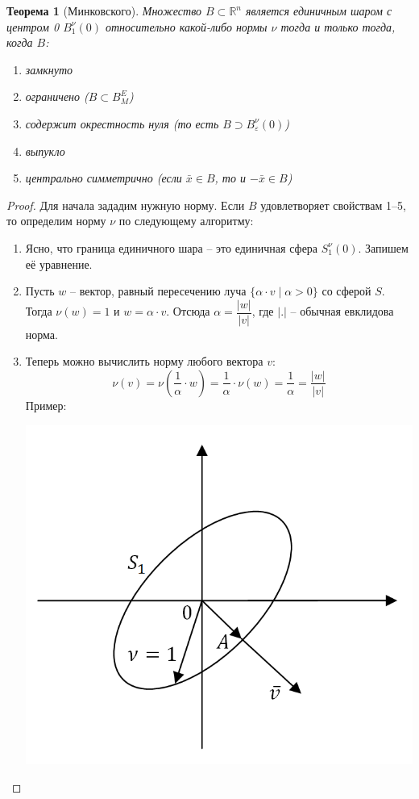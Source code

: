 \documentclass[12pt]{article}
\newtheorem*{theorem}{Теорема}
\begin{document}
	\begin{theorem}[Минковского]
		Множество $B \subset \mathbb{R}^n$ является единичным шаром с центром 0 $B_1^{\nu}(0)$ относительно какой-либо нормы $\nu$ тогда и только тогда, когда $B$:\begin{enumerate}
			\item замкнуто
			\item ограничено ($B \subset B_M^E$)
			\item содержит окрестность нуля (то есть $B \supset B_\varepsilon^\nu(0)$)
			\item выпукло
			\item центрально симметрично (если $\bar x \in B$, то и $-\bar x \in B$)
		\end{enumerate}
	\end{theorem}
	\begin{proof}
		 Для начала зададим нужную норму. Если $B$ удовлетворяет свойствам 1--5, то определим норму $\nu$ по следующему алгоритму:
		\begin{enumerate}
			\item Ясно, что граница единичного шара -- это единичная сфера $S_1^\nu(0)$. Запишем её уравнение.
			\item Пусть $w$ -- вектор, равный пересечению луча $\{\alpha\cdot v\mid \alpha > 0\}$ со сферой $S$. Тогда $\nu(w) = 1$ и $w = \alpha \cdot v$. Отсюда $\alpha = \dfrac{|w|}{|v|}$, где $|.|$ -- обычная евклидова норма.
			\item Теперь можно вычислить норму любого вектора $v$:
				\[\nu(v) = \nu\left(\dfrac{1}{\alpha}\cdot w\right) = \dfrac{1}{\alpha} \cdot \nu(w) = \dfrac{1}{\alpha} = \dfrac{|w|}{|v|}\]
			Пример:
			\begin{center}\includegraphics[scale=0.6]{l5_2.png}\\

\end{center}
\end{enumerate}
\end{proof}
\end{document}
